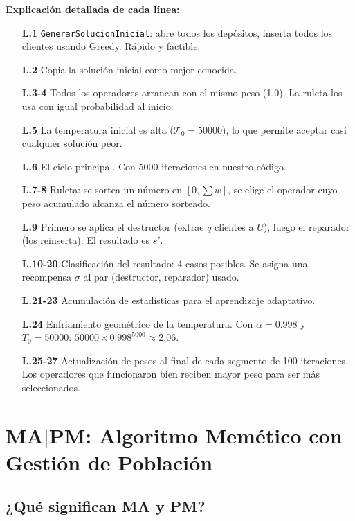 \documentclass[12pt,a4paper]{article}
\begin{document}
\textbf{Explicación detallada de cada línea:}

\begin{itemize}[leftmargin=2cm]
\item[\textbf{L.1}] \texttt{GenerarSolucionInicial}: abre todos los depósitos, inserta todos los clientes usando Greedy. Rápido y factible.
\item[\textbf{L.2}] Copia la solución inicial como mejor conocida.
\item[\textbf{L.3-4}] Todos los operadores arrancan con el mismo peso (1.0). La ruleta los usa con igual probabilidad al inicio.
\item[\textbf{L.5}] La temperatura inicial es alta ($\mathcal{T}_0=50000$), lo que permite aceptar casi cualquier solución peor.
\item[\textbf{L.6}] El ciclo principal. Con 5000 iteraciones en nuestro código.
\item[\textbf{L.7-8}] Ruleta: se sortea un número en $[0, \sum w]$, se elige el operador cuyo peso acumulado alcanza el número sorteado.
\item[\textbf{L.9}] Primero se aplica el destructor (extrae $q$ clientes a $U$), luego el reparador (los reinserta). El resultado es $s'$.
\item[\textbf{L.10-20}] Clasificación del resultado: 4 casos posibles. Se asigna una recompensa $\sigma$ al par (destructor, reparador) usado.
\item[\textbf{L.21-23}] Acumulación de estadísticas para el aprendizaje adaptativo.
\item[\textbf{L.24}] Enfriamiento geométrico de la temperatura. Con $\alpha=0.998$ y $T_0=50000$: $50000 \times 0.998^{5000} \approx 2.06$.
\item[\textbf{L.25-27}] Actualización de pesos al final de cada segmento de 100 iteraciones. Los operadores que funcionaron bien reciben mayor peso para ser más seleccionados.
\end{itemize}

\section{MA$|$PM: Algoritmo Memético con Gestión de Población}

\subsection{¿Qué significan MA y PM?}
\end{document}
